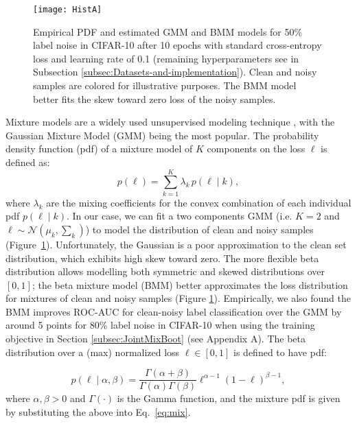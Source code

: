 \documentclass{article}
\begin{document}
\begin{figure}[t]
\centering{}\texttt{[image: HistA]}\caption{\label{fig:Normalized-histograms}Empirical PDF and estimated GMM and BMM models for 50\% label noise in CIFAR-10 after 10 epochs with standard cross-entropy loss and learning rate of 0.1 (remaining hyperparameters see in Subsection \ref{subsec:Datasets-and-implementation}). Clean and noisy samples are colored for illustrative purposes. The BMM model better fits the skew toward zero loss of the noisy samples.}
\end{figure}

Mixture models are a widely used unsupervised modeling technique
\cite{1999_GMM_BS,2006_PR_GMM_Imseg,2011_TPAMI_BMMestimation}, 
with the Gaussian Mixture Model (GMM) \cite{2006_PR_GMM_Imseg} being the most
popular. The probability density function (pdf) of a mixture model of
$K$ components on the loss $\ell$ is defined as: 
\begin{equation}
p\!\left(\ell\right)=\sum_{k=1}^{K}\lambda_{k}\,p\!\left(\ell\mid k\right),
\label{eq:mix}
\end{equation}
where $\lambda_{k}$ are the mixing coefficients for the convex combination
of each individual pdf $p\!\left(\ell\mid k\right)$. In our case,
we can fit a two components GMM (i.e. $K=2$ and $\ell\sim\mathcal{N}\left(\mu_{k},\sum_{k}\right)$)
to model the distribution of clean and noisy samples
(Figure~\ref{fig:Normalized-histograms}). Unfortunately, the Gaussian
is a poor approximation to the clean set
distribution, which exhibits high skew toward zero. The more flexible beta distribution \cite{2011_TPAMI_BMMestimation} allows modelling both symmetric and skewed distributions over $[0, 1]$; the beta mixture model (BMM) better approximates the loss distribution
for mixtures of clean and noisy samples (Figure \ref{fig:Normalized-histograms}). Empirically, we also found the BMM improves ROC-AUC for clean-noisy label classification over the GMM by around 5 points for 80\% label noise in CIFAR-10 when using the training objective in Section \ref{subsec:JointMixBoot} (see Appendix A).  The beta distribution over a (max) normalized loss $\ell\in\left[0,1\right]$
is defined to have pdf:

\begin{equation}
p\!\left(\ell\mid\alpha,\beta\right)=\frac{\Gamma\!\left(\alpha+\beta\right)}{\Gamma\!\left(\alpha\right)\Gamma\!\left(\beta\right)}\ell^{\alpha-1}\left(1-\ell\right)^{\beta-1},
\end{equation}
where $\alpha,\beta>0$ and $\Gamma\!\left(\cdot\right)$ is the Gamma
function, and the mixture pdf is given by substituting the above into Eq.~\eqref{eq:mix}.
\end{document}
